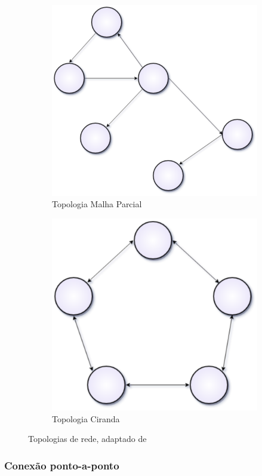 \documentclass[tcc,capa]{texufpel}
\begin{document}
\begin{figure}[h]
\begin{subfigure}{.24\textwidth}
  \includegraphics[width=.8\linewidth]{figs/pmesh.png}
  \caption{Topologia Malha Parcial}
  \label{fig:pmesh}
\end{subfigure}
\begin{subfigure}{.24\textwidth}
  \centering
  \includegraphics[width=.8\linewidth]{figs/dchain.png}
  \caption{Topologia Ciranda}
  \label{fig:dchain}
\end{subfigure}
\caption{Topologias de rede, adaptado de \cite{schiller}}
\label{fig:topo}
\end{figure}

\subsubsection{Conexão ponto-a-ponto}
\end{document}
